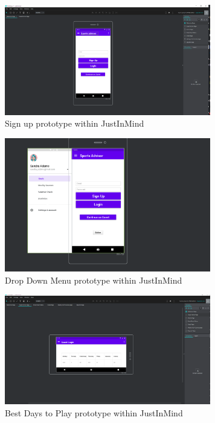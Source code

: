 \begin{figure}[H]
    \centering
    \includegraphics[width=9cm]{img/SignUpImage.PNG}
    \caption{Sign up prototype within JustInMind}
    \label{fig:altas config}
\end{figure}

\begin{figure}[H]
    \centering
    \includegraphics[width=9cm]{img/dropDownMenu.PNG}
    \caption{Drop Down Menu prototype within JustInMind}
    \label{fig:altas config}
\end{figure}

\begin{figure}[H]
    \centering
    \includegraphics[width=9cm]{img/BestDays.PNG}
    \caption{Best Days to Play prototype within JustInMind}
    \label{fig:altas config}
\end{figure}

